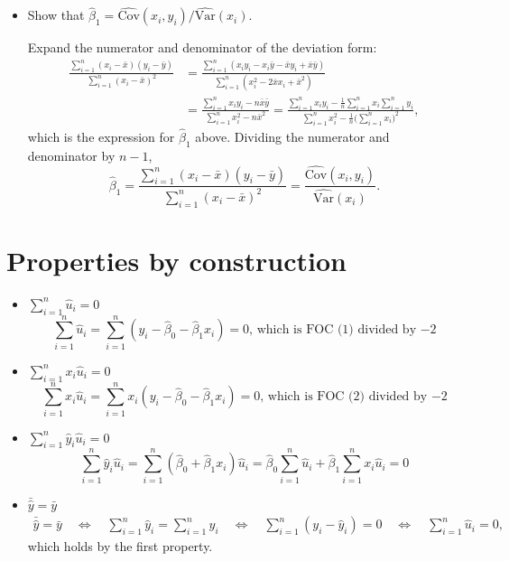 \documentclass[11pt]{article}
\newcommand{\var}{\text{Var}}
\newcommand{\cov}{\text{Cov}}
\begin{document}
\begin{itemize}
\item Show that $\hat\beta_1=\widehat{\cov}(x_i,y_i)/\widehat{\var}(x_i)$.

Expand the numerator and denominator of the deviation form:
\begin{align*}
\frac{\sum_{i=1}^n (x_i - \bar{x})(y_i -  \bar{y})}{\sum_{i=1}^n(x_i - \bar{x})^2}
&= \frac{\sum_{i=1}^n (x_i y_i - x_i\bar y -\bar x y_i + \bar x \bar y)}{\sum_{i=1}^n(x_i^2-2\bar x x_i +\bar x^2)} \\
&= \frac{\sum_{i=1}^n x_i y_i - n\bar x\bar y}{\sum_{i=1}^n x_i^2 - n\bar x^2}
= \frac{\sum_{i=1}^n x_i y_i -\frac{1}{n} \sum_{i=1}^n x_i\sum_{i=1}^n y_i }{\sum_{i=1}^n x_i^2-\frac{1}{n}\big(\sum_{i=1}^n x_i\big)^2},
\end{align*}
which is the expression for $\hat\beta_1$ above. Dividing the numerator and denominator by $n-1$,
$$
\hat{\beta}_1  = \frac{\sum_{i=1}^n (x_i - \bar{x})(y_i -  \bar{y})}{\sum_{i=1}^n(x_i - \bar{x})^2}
= \frac{\widehat{\cov}(x_i,y_i)}{\widehat{\var}(x_i)}.
$$
\end{itemize}
\clearpage

\section{Properties by construction}

\begin{itemize}
\item $\sum_{i=1}^n \hat{u}_i = 0$
\[
\sum_{i=1}^n \hat{u}_i =
\sum_{i=1}^n (y_i- \hat\beta_0-\hat\beta_1 x_i) = 0\text{, which is FOC (1) divided by $-2$}
\]

\item $\sum_{i=1}^n x_i \hat{u}_i = 0$
\[
\sum_{i=1}^n x_i \hat{u}_i = \sum_{i=1}^n x_i (y_i- \hat\beta_0-\hat\beta_1 x_i) = 0\text{, which is FOC (2) divided by $-2$}
\]

\item $\sum_{i=1}^n \hat{y}_i \hat{u}_i = 0$
\[
\sum_{i=1}^n \hat{y}_i \hat{u}_i = \sum_{i=1}^n (\hat\beta_0+\hat\beta_1 x_i) \hat{u}_i =
\hat\beta_0\sum_{i=1}^n \hat{u}_i + \hat\beta_1\sum_{i=1}^n x_i \hat{u}_i=0
\]

\item $\bar{\hat{y}} = \bar{y}$
\begin{align*}
\bar{\hat{y}} = \bar{y}
\quad\Leftrightarrow\quad \sum_{i=1}^n \hat{y}_i = \sum_{i=1}^n y_i
\quad\Leftrightarrow\quad \sum_{i=1}^n (y_i - \hat{y}_i)=0
\quad\Leftrightarrow\quad \sum_{i=1}^n \hat u_i = 0,
\end{align*}
which holds by the first property.
\end{itemize}
\end{document}
